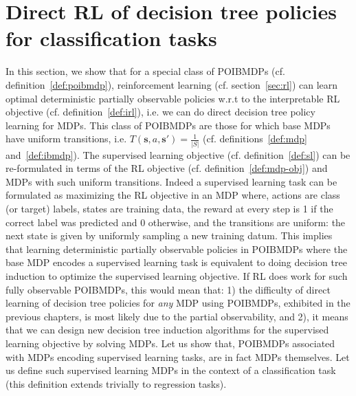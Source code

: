 \chapter{Direct RL of decision tree policies for classification tasks}\label{sec:pomdp-classif}
In this section, we show that for a special class of POIBMDPs (cf. definition~\ref{def:poibmdp}), reinforcement learning (cf. section~\ref{sec:rl}) can learn optimal deterministic partially observable policies w.r.t to the interpretable RL objective (cf. definition~\ref{def:irl}), i.e. we can do direct decision tree policy learning for MDPs.
This class of POIBMDPs are those for which base MDPs have uniform transitions, i.e. $T(\boldsymbol{s}, a, \boldsymbol{s}') = \frac{1}{|S|}$ (cf. definitions~\ref{def:mdp} and~\ref{def:ibmdp}).
The supervised learning objective (cf. definition~\ref{def:sl}) can be re-formulated in terms of the RL objective (cf. definition~\ref{def:mdp-obj}) and MDPs with such uniform transitions.
Indeed a supervised learning task can be formulated as maximizing the RL objective in an MDP where, actions are class (or target) labels, states are training data, the reward at every step is 1 if the correct label was predicted and 0 otherwise, and the transitions are uniform: the next state is given by uniformly sampling a new training datum. 
This implies that learning deterministic partially observable policies in POIBMDPs where the base MDP encodes a supervised learning task is equivalent to doing decision tree induction to optimize the supervised learning objective.
If RL does work for such fully observable POIBMDPs, this would mean that: 1) the difficulty of direct learning of decision tree policies for \textit{any} MDP using POIBMDPs, exhibited in the previous chapters, is most likely due to the partial observability, and 2), it means that we can design new decision tree induction algorithms for the supervised learning objective by solving MDPs.
Let us show that, POIBMDPs associated with MDPs encoding supervised learning tasks, are in fact MDPs themselves.
Let us define such supervised learning MDPs in the context of a classification task (this definition extends trivially to regression tasks).
